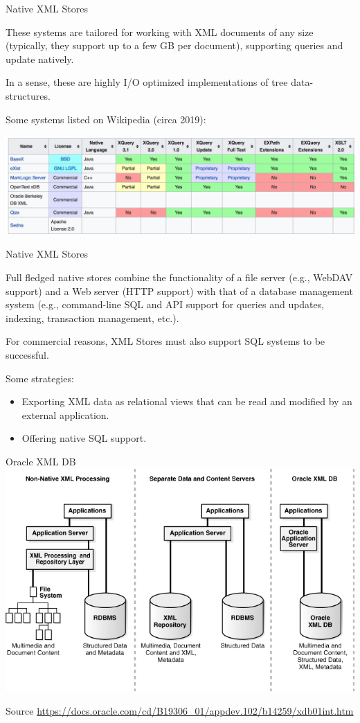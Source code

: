 \begin{frame}{Native XML Stores}

These systems are tailored for working with XML documents of any size (typically, they support up to a few GB per document), supporting queries and update natively.

In a sense, these are highly I/O optimized implementations of tree data-structures.

Some systems listed on Wikipedia (circa 2019):

\hspace*{-20pt}\includegraphics[width=1.15\textwidth]{figures/native_XML_stores.png}
\end{frame}


\begin{frame}{Native XML Stores}

Full fledged native stores combine the functionality of a file server (e.g., WebDAV support) and a Web server (HTTP support) with that of a database management system (e.g., command-line SQL and API support for queries and updates, indexing, transaction management, etc.).

For commercial reasons, XML Stores must also support SQL systems to be successful. 

Some strategies:
\begin{itemize}[-]
\item Exporting XML data as relational views that can be read and modified by an external application.
\item Offering native SQL support.
\end{itemize}
\end{frame}

\begin{frame}{Oracle XML DB}
\includegraphics[width=\textwidth]{figures/Oracle_XMLDB.png}

\footnotesize Source \url{https://docs.oracle.com/cd/B19306_01/appdev.102/b14259/xdb01int.htm}
\end{frame}


